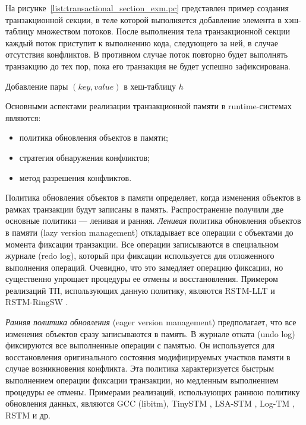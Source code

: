 На рисунке~\ref{list:transactional_section_exm.pc} представлен пример создания 
транзакционной секции, в теле которой выполняется добавление элемента в 
хэш-таблицу множеством потоков. После выполнения тела транзакционной секции 
каждый поток приступит к выполнению кода, следующего за ней, в случае отсутствия 
конфликтов. В противном случае поток повторно будет выполнять транзакцию до тех 
пор, пока его транзакция не будет успешно зафиксирована.


\begin{ListingEnv}[!h]
  
    \caption{Добавление пары $(key, value)$ в хеш-таблицу $h$}
    \label{list:transactional_section_exm.pc}
\end{ListingEnv}

{}{}

Основными аспектами реализации транзакционной памяти в runtime-системах 
являются:
\begin{itemize}
\item политика обновления объектов в памяти;
\item стратегия обнаружения конфликтов;
\item метод разрешения конфликтов.
\end{itemize}

Политика обновления объектов в памяти определяет, когда изменения объектов в 
рамках транзакции будут записаны в память. Распространение получили две основные
политики --- ленивая и ранняя. \textit{Ленивая} политика обновления объектов в 
памяти (lazy version management) откладывает все операции с объектами до момента
фиксации транзакции. Все операции записываются в специальном журнале (redo log),
который при фиксации используется для отложенного выполнения операций. Очевидно,
что это замедляет операцию фиксации, но существенно упрощает процедуры ее отмены
и восстановления. Примером реализаций ТП, использующих данную политику, являются
RSTM-LLT \cite{rstm_proj} и RSTM-RingSW \cite{spear_strategy_for_cm, 
spear_ringstm}.

\textit{Ранняя политика обновления} (eager version management) предполагает, что
все изменения объектов сразу записываются в память. В журнале отката (undo log) 
фиксируются все выполненные операции с памятью. Он используется для 
восстановления оригинального состояния модифицируемых участков памяти в случае 
возникновения конфликта. Эта политика характеризуется быстрым выполнением 
операции фиксации транзакции, но медленным выполнением процедуры ее отмены. 
Примерами реализаций, использующих раннюю политику обновления данных, являются 
GCC (libitm), TinySTM \cite{felber_fetzer_marlier_riegel}, LSA-STM 
\cite{riegel_felber_fetzer}, Log-TM \cite{kevin_bobba_logtm}, RSTM 
\cite{rstm_proj} и др.
 

